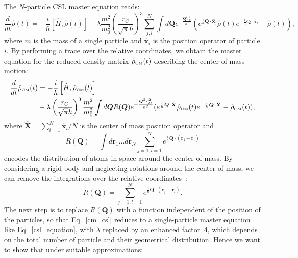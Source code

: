 \documentclass[12pt,groupedaddress,pra,aps]{revtex4-1}
\begin{document}
The $N$-particle CSL master equation reads:
\begin{equation}\label{many_particle_csl}
\frac{d }{d t}\hat{\rho}(t)= 
-\frac{i}{\hbar}\left[\hat{H},\hat{\rho}(t) \right]
+ \lambda  \frac{m^2}{m_0^2} \left(\frac{ r_C} {\sqrt{\pi} \hbar}\right)^3  \sum_{j,l}^{N} 
 \int d \bm{Q} e^{-\frac{\bm{Q}^2r_C^2}{\hbar^2}}
 \left(e^{\frac{i}{\hbar} \bm{Q} \cdot \hat{\bm{x}}_j}\hat{\rho}(t)e^{-\frac{i}{\hbar} \bm{Q} \cdot \hat{\bm{x}}_l}- \hat{\rho}(t)\right),
\end{equation}
where $m$ is the mass of a single particle and $\bm{\hat{x}}_i$ is the position operator of particle $i$. By performing a trace over the relative coordinates, we obtain the master equation for the reduced density matrix $\hat{\rho}_{\text{\tiny CM}}(t)$ describing the center-of-mass motion:
\begin{equation}\label{cm_csl}
\begin{split}
\frac{d }{d t}\hat{\rho}_{\text{\tiny CM}}(t) &= 
-\frac{i}{\hbar}\left[\hat{H},\hat{\rho}_{\text{\tiny CM}}(t) \right]\\
&+\lambda \left(\frac{ r_C} {\sqrt{\pi} \hbar}\right)^3 \frac{m^2}{m_0^2} 
\int d \bm{Q} R(\bm{Q}) e^{-\frac{\bm{Q}^2r_C^2}{\hbar^2}}
(e^{\frac{i}{\hbar} \bm{Q} \cdot \hat{\bm{X}}}\hat{\rho}_{\text{\tiny CM}}(t)e^{-\frac{i}{\hbar} \bm{Q} \cdot \hat{\bm{X}}}- \hat{\rho}_{\text{\tiny CM}}(t)),
\end{split}
\end{equation}
where $\bm{\hat{X}}=\sum_{i=1}^{N}\bm{\hat{x}}_i/N$ is the center of mass position operator and
\begin{equation}
R(\bm{Q})=\int  d\bm{r}_1...d\bm{r}_N \sum_{j=1,l=1}^{N} e^{\frac{i}{\hbar} \bm{Q} \cdot (\bm{r}_j-\bm{r}_l)}
\end{equation}
encodes  the distribution of atoms in space around the center of mass. By considering a rigid body and neglecting rotations around the center of mass, we can remove the integrations over the relative coordinates~\cite{PhysRevA.42.78}:
\begin{equation}\label{R_function}
R(\bm{Q})= \sum_{j=1,l=1}^{N} e^{\frac{i}{\hbar} \bm{Q} \cdot (\bm{r}_j-\bm{r}_l)}.
\end{equation}
The next step  is to replace $R(\bm{Q})$ with a function independent of the position of the particles, so that Eq.~\eqref{cm_csl} reduces to a single-particle master equation like Eq.~\eqref{csl_equation}, with $\lambda$  replaced by an enhanced factor  $\Lambda$, which depends on the total number of particle and their geometrical distribution. Hence we want to show that under suitable approximations: 
\end{document}
